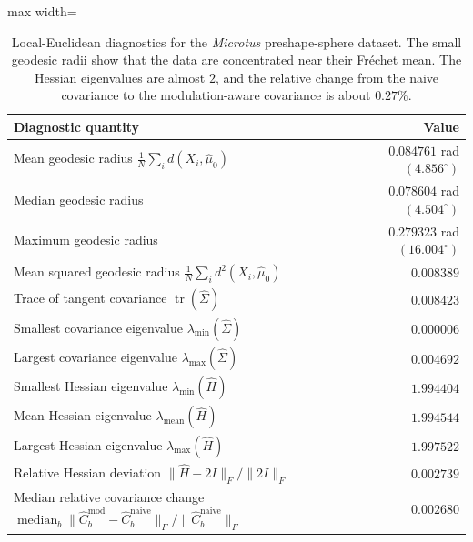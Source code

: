 \documentclass{amsart}
\theoremstyle{definition}
\theoremstyle{remark}
\newcommand\0{\boldsymbol{0}}
\begin{document}
\begin{table}[H]
\centering
\caption{Local-Euclidean diagnostics for the \textit{Microtus} preshape-sphere dataset.  The small geodesic radii show that the data are concentrated near their Fr\'echet mean.  The Hessian eigenvalues are almost \(2\), and the relative change from the naive covariance to the modulation-aware covariance is about \(0.27\%\).}
\label{tab:microtus-local-euclidean}
\begin{adjustbox}{max width=\textwidth}
\begin{tabular}{lr}
\toprule
Diagnostic quantity & Value \\
\midrule
Mean geodesic radius \(\frac1N\sum_i d(X_i,\hat\mu_0)\) & \(0.084761\) rad \((4.856^\circ)\) \\
Median geodesic radius & \(0.078604\) rad \((4.504^\circ)\) \\
Maximum geodesic radius & \(0.279323\) rad \((16.004^\circ)\) \\
Mean squared geodesic radius \(\frac1N\sum_i d^2(X_i,\hat\mu_0)\) & \(0.008389\) \\
Trace of tangent covariance \(\operatorname{tr}(\widehat\Sigma)\) & \(0.008423\) \\
Smallest covariance eigenvalue \(\lambda_{\min}(\widehat\Sigma)\) & \(0.000006\) \\
Largest covariance eigenvalue \(\lambda_{\max}(\widehat\Sigma)\) & \(0.004692\) \\
Smallest Hessian eigenvalue \(\lambda_{\min}(\widehat H)\) & \(1.994404\) \\
Mean Hessian eigenvalue \(\lambda_{\mathrm{mean}}(\widehat H)\) & \(1.994544\) \\
Largest Hessian eigenvalue \(\lambda_{\max}(\widehat H)\) & \(1.997522\) \\
Relative Hessian deviation \(\|\widehat H-2I\|_F/\|2I\|_F\) & \(0.002739\) \\
Median relative covariance change
\(\operatorname{median}_b\|\widehat C_b^{\mathrm{mod}}-\widehat C_b^{\mathrm{naive}}\|_F/
\|\widehat C_b^{\mathrm{naive}}\|_F\)
& \(0.002680\) \\
\bottomrule
\end{tabular}
\end{adjustbox}
\end{table}
\end{document}
